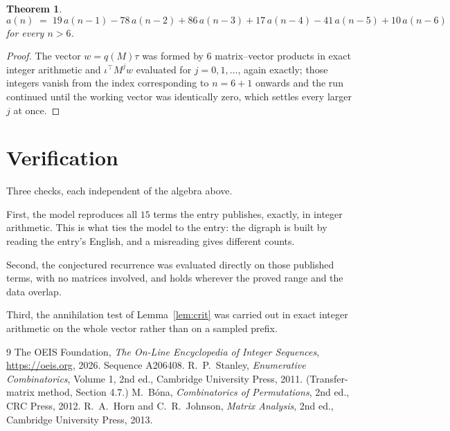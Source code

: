 \documentclass[11pt,a4paper]{article}
\theoremstyle{plain}
\newtheorem{theorem}{Theorem}
\theoremstyle{definition}
\begin{document}
\begin{theorem}
\[
a(n)\;=\;19\,a(n-1) - 78\,a(n-2) + 86\,a(n-3) + 17\,a(n-4) - 41\,a(n-5) + 10\,a(n-6)
\]
for every $n>6$.
\end{theorem}

\begin{proof}
The vector $w=q(M)\tau$ was formed by $6$ matrix--vector products in exact integer
arithmetic and $\iota^{\!\top}M^{j}w$ evaluated for $j=0,1,\dots$, again exactly; those
integers vanish from the index corresponding to $n=6+1$ onwards and the run continued
until the working vector was identically zero, which settles every larger $j$ at once.
\end{proof}

\section{Verification}

Three checks, each independent of the algebra above.

First, the model reproduces all $15$ terms the entry publishes, exactly, in integer
arithmetic. This is what ties the model to the entry: the digraph is built by reading the
entry's English, and a misreading gives different counts.

Second, the conjectured recurrence was evaluated directly on those published terms, with no
matrices involved, and holds wherever the proved range and the data overlap.

Third, the annihilation test of Lemma~\ref{lem:crit} was carried out in exact integer
arithmetic on the whole vector rather than on a sampled prefix.

\begin{thebibliography}{9}
 The OEIS Foundation, \emph{The On-Line Encyclopedia of Integer
Sequences}, \url{https://oeis.org}, 2026. Sequence A206408.
 R.~P.~Stanley, \emph{Enumerative Combinatorics}, Volume 1, 2nd ed.,
Cambridge University Press, 2011. (Transfer-matrix method, Section 4.7.)
 M.~B\'ona, \emph{Combinatorics of Permutations}, 2nd ed., CRC
Press, 2012.
 R.~A.~Horn and C.~R.~Johnson, \emph{Matrix Analysis}, 2nd ed., Cambridge
University Press, 2013.
\end{thebibliography}
\end{document}
